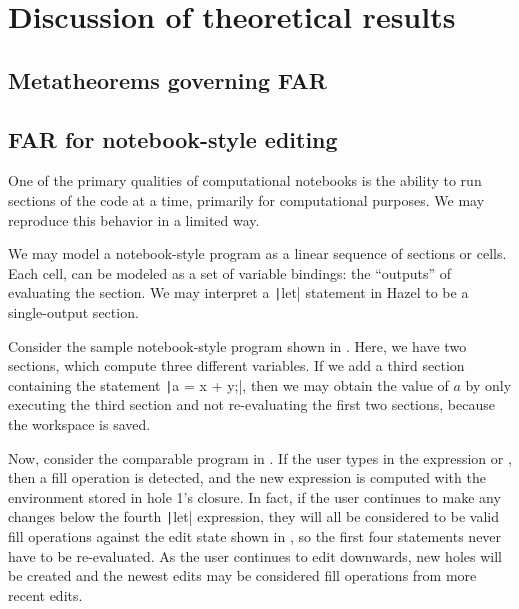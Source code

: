 \chapter{Discussion of theoretical results}
\label{sec:discussion}

\section{Metatheorems governing FAR}
\label{sec:far-meta}




\section{FAR for notebook-style editing}
\label{sec:notebook-ui}

One of the primary qualities of computational notebooks is the ability to run sections of the code at a time, primarily for computational purposes. We may reproduce this behavior in a limited way.

We may model a notebook-style program as a linear sequence of sections or cells. Each cell, can be modeled as a set of variable bindings: the ``outputs'' of evaluating the section. We may interpret a \texttt|let| statement in Hazel to be a single-output section.

Consider the sample notebook-style program shown in . Here, we have two sections, which compute three different variables. If we add a third section containing the statement \texttt|a = x + y;|, then we may obtain the value of $a$ by only executing the third section and not re-evaluating the first two sections, because the workspace is saved.

Now, consider the comparable program in . If the user types in the expression  or , then a fill operation is detected, and the new expression is computed with the environment stored in hole 1's closure. In fact, if the user continues to make any changes below the fourth \texttt|let| expression, they will all be considered to be valid fill operations against the edit state shown in , so the first four statements never have to be re-evaluated. As the user continues to edit downwards, new holes will be created and the newest edits may be considered fill operations from more recent edits.

